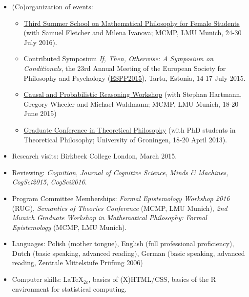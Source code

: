 \documentclass[a4paper,12pt]{article}
\begin{document}
\begin{small}
  \begin{itemize}
  	\item (Co)organization of events:
  		\begin{itemize}
		  \item \href{http://www.mathsummer.philosophie.uni-muenchen.de}{Third Summer School on Mathematical Philosophy for Female Students} (with Samuel Fletcher and Milena Ivanova; MCMP, LMU Munich, 24-30 July 2016).
		  \item Contributed Symposium \emph{If, Then, Otherwise: A Symposium on Conditionals}, the 23rd Annual Meeting of the European Society for Philosophy and Psychology (\href{http://espp2015.ut.ee}{ESPP2015}), Tartu, Estonia, 14-17 July 2015.
		  \item \href{http://lmu.de/cpr2015}{Causal and Probabilistic Reasoning Workshop} (with Stephan Hartmann, Gregory Wheeler and Michael Waldmann; MCMP, LMU Munich, 18-20 June 2015)
		  \item  \href{http://www.philos.rug.nl/GCTP2013/}{Graduate Conference in
	      Theoretical Philosophy} (with PhD students in Theoretical Philosophy; University of Groningen, 18-20 April 2013).
  		\end{itemize}
  	\item Research visits: Birkbeck College London, March 2015.

    \item Reviewing: \emph{Cognition}, \emph{Journal of Cognitive Science}, \emph{Minds \& Machines}, \emph{CogSci2015}, \emph{CogSci2016}.
    
    \item Program Committee Memberships: \emph{Formal Epistemology Workshop 2016} (RUG), \emph{Semantics of Theories Conference} (MCMP, LMU Munich), \emph{2nd Munich Graduate Workshop in Mathematical Philosophy: Formal Epistemology} (MCMP, LMU Munich).
  \end{itemize}



  \begin{itemize}
  \item Languages: Polish (mother tongue), English (full professional proficiency), Dutch
    (basic speaking, advanced reading), German (basic speaking, advanced reading, Zentrale
    Mittelstufe Pr\"ufung 2006)
  \item Computer skills: \LaTeX$_{2e}$, basics of
    (X)HTML/CSS, basics of the R environment for statistical
    computing.


\end{itemize}
\end{small}
\end{document}
